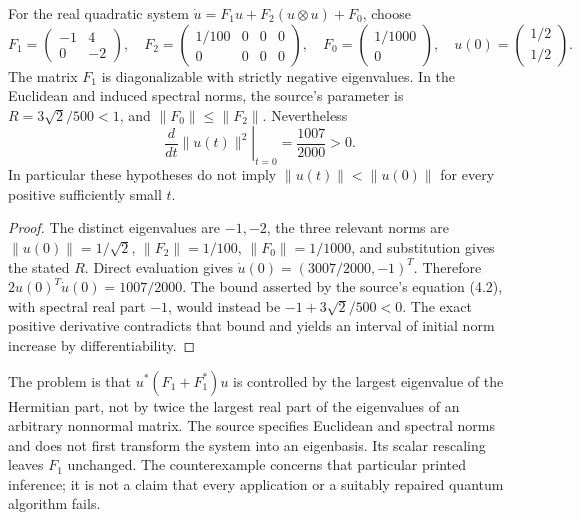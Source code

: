 \begin{proposition}
\label{prop:fluid-nonnormal-counterexample}
For the real quadratic system $\dot u=F_1u+F_2(u\otimes u)+F_0$, choose
\[
 F_1=\begin{pmatrix}-1&4\\0&-2\end{pmatrix},\quad
 F_2=\begin{pmatrix}1/100&0&0&0\\0&0&0&0\end{pmatrix},\quad
 F_0=\begin{pmatrix}1/1000\\0\end{pmatrix},\quad
 u(0)=\begin{pmatrix}1/2\\1/2\end{pmatrix}.
\]
The matrix $F_1$ is diagonalizable with strictly negative eigenvalues. In the Euclidean and induced spectral norms, the source's parameter is $R=3\sqrt2/500<1$, and $\|F_0\|\le\|F_2\|$. Nevertheless
\[
 \left.\frac d{dt}\|u(t)\|^2\right|_{t=0}=\frac{1007}{2000}>0.
\]
In particular these hypotheses do not imply $\|u(t)\|<\|u(0)\|$ for every positive sufficiently small $t$.
\end{proposition}
\begin{proof}
The distinct eigenvalues are $-1,-2$, the three relevant norms are
$\|u(0)\|=1/\sqrt2$, $\|F_2\|=1/100$, $\|F_0\|=1/1000$,
and substitution gives the stated $R$. Direct evaluation gives
$\dot u(0)=(3007/2000,-1)^T$. Therefore
$2u(0)^T\dot u(0)=1007/2000$. The bound asserted by the source's equation (4.2), with spectral real part $-1$, would instead be
$-1+3\sqrt2/500<0$. The exact positive derivative contradicts that bound and yields an interval of initial norm increase by differentiability.
\end{proof}

The problem is that $u^*(F_1+F_1^*)u$ is controlled by the largest eigenvalue of the Hermitian part, not by twice the largest real part of the eigenvalues of an arbitrary nonnormal matrix. The source specifies Euclidean and spectral norms and does not first transform the system into an eigenbasis. Its scalar rescaling leaves $F_1$ unchanged. The counterexample concerns that particular printed inference; it is not a claim that every application or a suitably repaired quantum algorithm fails.


